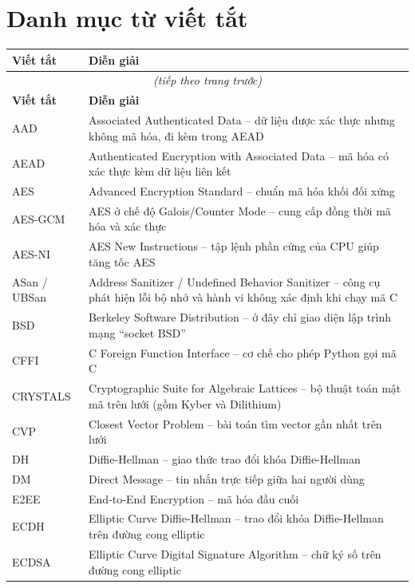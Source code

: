 \chapter*{Danh mục từ viết tắt}

\renewcommand{\arraystretch}{1.3}
\begin{longtable}{p{2.7cm} p{12.3cm}}
\textbf{Viết tắt} & \textbf{Diễn giải} \\
\hline
\endfirsthead
\multicolumn{2}{c}{\textit{(tiếp theo trang trước)}} \\
\textbf{Viết tắt} & \textbf{Diễn giải} \\
\hline
\endhead
AAD & Associated Authenticated Data -- dữ liệu được xác thực nhưng không mã hóa, đi kèm trong AEAD \\
AEAD & Authenticated Encryption with Associated Data -- mã hóa có xác thực kèm dữ liệu liên kết \\
AES & Advanced Encryption Standard -- chuẩn mã hóa khối đối xứng \\
AES-GCM & AES ở chế độ Galois/Counter Mode -- cung cấp đồng thời mã hóa và xác thực \\
AES-NI & AES New Instructions -- tập lệnh phần cứng của CPU giúp tăng tốc AES \\
ASan / UBSan & Address Sanitizer / Undefined Behavior Sanitizer -- công cụ phát hiện lỗi bộ nhớ và hành vi không xác định khi chạy mã C \\
BSD & Berkeley Software Distribution -- ở đây chỉ giao diện lập trình mạng ``socket BSD'' \\
CFFI & C Foreign Function Interface -- cơ chế cho phép Python gọi mã C \\
CRYSTALS & Cryptographic Suite for Algebraic Lattices -- bộ thuật toán mật mã trên lưới (gồm Kyber và Dilithium) \\
CVP & Closest Vector Problem -- bài toán tìm vector gần nhất trên lưới \\
DH & Diffie-Hellman -- giao thức trao đổi khóa Diffie-Hellman \\
DM & Direct Message -- tin nhắn trực tiếp giữa hai người dùng \\
E2EE & End-to-End Encryption -- mã hóa đầu cuối \\
ECDH & Elliptic Curve Diffie-Hellman -- trao đổi khóa Diffie-Hellman trên đường cong elliptic \\
ECDSA & Elliptic Curve Digital Signature Algorithm -- chữ ký số trên đường cong elliptic \\

\end{longtable}
